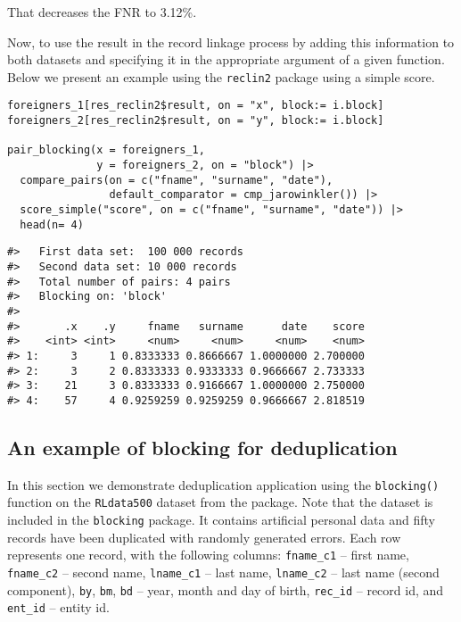 That decreases the FNR to
3.12\%.

Now, to use the result in the record linkage process by adding this information to both datasets and specifying it in the appropriate argument of a given function.
Below we present an example using the \texttt{reclin2} package using a simple score.

\begin{verbatim}
foreigners_1[res_reclin2$result, on = "x", block:= i.block]
foreigners_2[res_reclin2$result, on = "y", block:= i.block]

pair_blocking(x = foreigners_1,
              y = foreigners_2, on = "block") |>
  compare_pairs(on = c("fname", "surname", "date"),
                default_comparator = cmp_jarowinkler()) |>
  score_simple("score", on = c("fname", "surname", "date")) |>
  head(n= 4)
\end{verbatim}

\begin{verbatim}
#>   First data set:  100 000 records
#>   Second data set: 10 000 records
#>   Total number of pairs: 4 pairs
#>   Blocking on: 'block'
#>
#>       .x    .y     fname   surname      date    score
#>    <int> <int>     <num>     <num>     <num>    <num>
#> 1:     3     1 0.8333333 0.8666667 1.0000000 2.700000
#> 2:     3     2 0.8333333 0.9333333 0.9666667 2.733333
#> 3:    21     3 0.8333333 0.9166667 1.0000000 2.750000
#> 4:    57     4 0.9259259 0.9259259 0.9666667 2.818519
\end{verbatim}

\subsection{An example of blocking for deduplication}\label{an-example-of-blocking-for-deduplication}

In this section we demonstrate deduplication application using the \texttt{blocking()} function on the
\texttt{RLdata500} dataset from the  package. Note that
the dataset is included in the \texttt{blocking} package. It contains
artificial personal data and fifty records have been duplicated with
randomly generated errors. Each row represents one record, with the
following columns: \texttt{fname\_c1} -- first name, \texttt{fname\_c2} -- second name,
\texttt{lname\_c1} -- last name, \texttt{lname\_c2} -- last name (second component),
\texttt{by}, \texttt{bm}, \texttt{bd} -- year, month and day of birth, \texttt{rec\_id} -- record id, and
\texttt{ent\_id} -- entity id.

